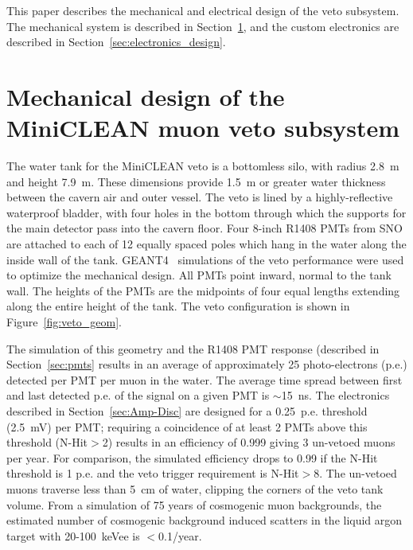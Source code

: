 \documentclass{JINST}
\begin{document}
This paper describes the mechanical and electrical design of the veto
subsystem.  The mechanical system is described in
Section~\ref{sec:subsystem_design}, and the custom electronics are
described in Section~\ref{sec:electronics_design}.


\section{Mechanical design of the MiniCLEAN muon veto subsystem}
\label{sec:subsystem_design}
%
The water tank for the MiniCLEAN veto is a bottomless silo, with
radius 2.8~m and height 7.9~m. These dimensions provide 1.5~m or
greater water thickness between the cavern air and outer vessel. The
veto is lined by a highly-reflective waterproof bladder, with four
holes in the bottom through which the supports for the main detector
pass into the cavern floor. Four 8-inch R1408 PMTs from SNO are
attached to each of 12 equally spaced poles which hang in the water
along the inside wall of the tank. GEANT4~\cite{ref:geant4} simulations
of the veto performance were used to optimize the mechanical
design. All PMTs point inward, normal to the tank wall. The heights
of the PMTs are the midpoints of four equal lengths extending along
the entire height of the tank. The veto configuration is shown in
Figure~\ref{fig:veto_geom}.  

The simulation of this geometry and the R1408 PMT response (described
in Section~\ref{sec:pmts} results in an average of approximately 25
photo-electrons (p.e.) detected per PMT per muon in the water.  The
average time spread between first and last detected p.e. of the signal
on a given PMT is $\sim$15~ns.  The electronics described in
Section~\ref{sec:Amp-Disc} are designed for a 0.25~p.e. threshold (2.5~mV)
per PMT; requiring a coincidence of at least 2 PMTs above this
threshold (N-Hit$>$2) results in an efficiency of 0.999 giving 3
un-vetoed muons per year.  For comparison, the simulated efficiency
drops to 0.99 if the N-Hit threshold is 1 p.e. and the veto trigger
requirement is N-Hit$>$8.  The un-vetoed muons traverse less than 5~cm
of water, clipping the corners of the veto tank volume.  From a
simulation of 75 years of cosmogenic muon backgrounds, the estimated
number of cosmogenic background induced scatters in the liquid argon
target with 20-100~keVee is $<$0.1/year.
\end{document}
